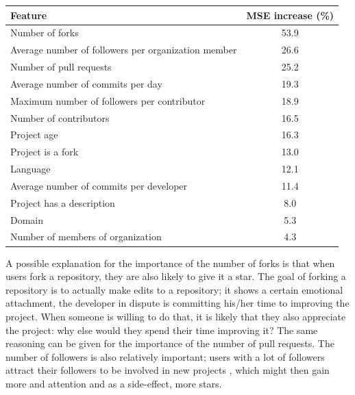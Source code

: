      
      \begin{center}
        \begin{tabular}[width=250pt]{|p{5cm}|c|}
            \hline
            Feature                                                       & MSE increase (\%) \\
            \hline
                Number of forks                                            & 53.9     \\
                Average number of followers per organization member        & 26.6    \\
                Number of pull requests                                    & 25.2     \\
                Average number of commits per day                          & 19.3     \\
                Maximum number of followers per contributor                & 18.9                   \\                    
                Number of contributors                                     & 16.5      \\
                Project age                                                & 16.3  \\
                Project is a fork                                          & 13.0      \\
                Language                                                   & 12.1      \\
                Average number of commits per developer                    & 11.4         \\
                Project has a description                                  & 8.0 \\
                Domain                                                     & 5.3 \\
                Number of members of organization                          & 4.3 \\
            \hline
        \end{tabular}
        \label{table:inc-mse-feature-removal}
     \end{center}
     
     A possible explanation for the importance of the number of forks is that when users fork a repository, they are also likely to give it a star. 
     The goal of forking a repository is to actually make edits to a repository; it shows a certain emotional attachment, the developer in dispute is committing his/her time to improving the project. 
     When someone is willing to do that, it is likely that they also appreciate the project: why else would they spend their time improving it? The same reasoning can be given for the importance of the number of pull requests.
     The number of followers is also relatively important; users with a lot of followers attract their followers to be involved in new projects \cite{blincoe-2015}, which might then gain more and attention and as a side-effect, more stars.
     

